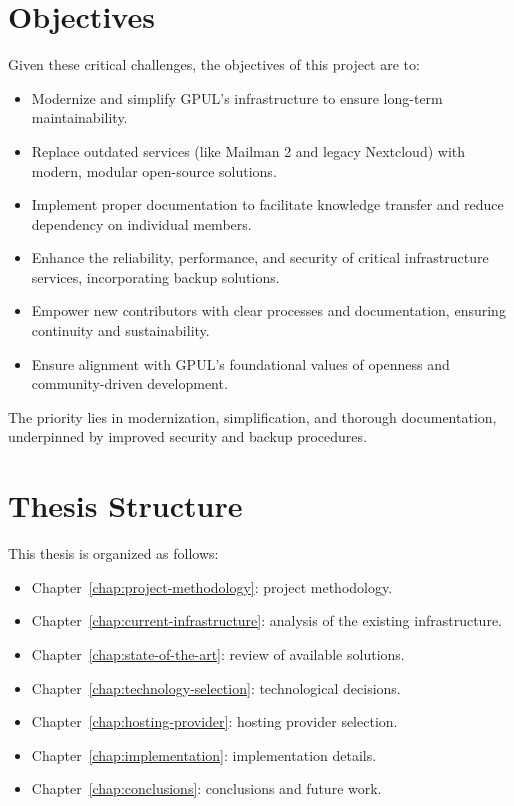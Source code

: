 \section{Objectives}

Given these critical challenges, the objectives of this project are to:

\begin{itemize}
    \item Modernize and simplify GPUL's infrastructure to ensure long-term maintainability.
    \item Replace outdated services (like Mailman 2 and legacy Nextcloud) with modern, modular open-source solutions.
    \item Implement proper documentation to facilitate knowledge transfer and reduce dependency on individual members.
    \item Enhance the reliability, performance, and security of critical infrastructure services, incorporating backup solutions.
    \item Empower new contributors with clear processes and documentation, ensuring continuity and sustainability.
    \item Ensure alignment with GPUL's foundational values of openness and community-driven development.
\end{itemize}

The priority lies in modernization, simplification, and thorough documentation, underpinned by improved security and backup procedures.

\section{Thesis Structure}

This thesis is organized as follows:
\begin{itemize}
    \item Chapter~\ref{chap:project-methodology}: project methodology.
    \item Chapter~\ref{chap:current-infrastructure}: analysis of the existing infrastructure.
    \item Chapter~\ref{chap:state-of-the-art}: review of available solutions.
    \item Chapter~\ref{chap:technology-selection}: technological decisions.
    \item Chapter~\ref{chap:hosting-provider}: hosting provider selection.
    \item Chapter~\ref{chap:implementation}: implementation details.
    \item Chapter~\ref{chap:conclusions}: conclusions and future work.
\end{itemize}
